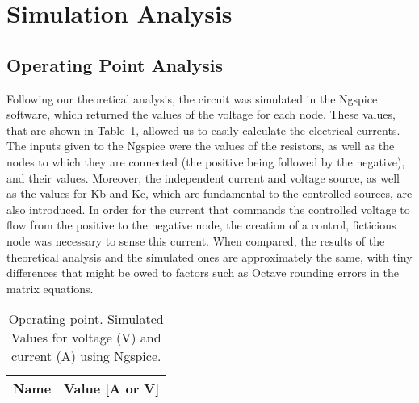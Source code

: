 \section{Simulation Analysis}
\label{sec:simulation}

\subsection{Operating Point Analysis}

Following our theoretical analysis, the circuit was simulated in the Ngspice software, which returned the values of the voltage for each node. These values, that are shown in Table~\ref{tab:op}, allowed us to easily calculate the electrical currents. 
The inputs given to the Ngspice were the values of the resistors, as well as the nodes to which they are connected (the positive being followed by the negative), and their values. Moreover, the independent current and voltage source, as well as the values for Kb and Kc, which are fundamental to the controlled sources, are also introduced. 
In order for the current that commands the controlled voltage to flow from the positive to the negative node, the creation of a control, ficticious node was necessary to sense this current.
When compared, the results of the theoretical analysis and the simulated ones are approximately the same, with tiny differences that might be owed to factors such as Octave rounding errors in the matrix equations.

\vspace{7.0cm}

\begin{table}[h]
  \centering
  \begin{tabular}{|l|r|}
    \hline    
    {\bf Name} & {\bf Value [A or V]} \\ \hline
    
  \end{tabular}
  \caption{Operating point. Simulated Values for voltage (V) and current (A) using Ngspice.}
  \label{tab:op}
\end{table}




